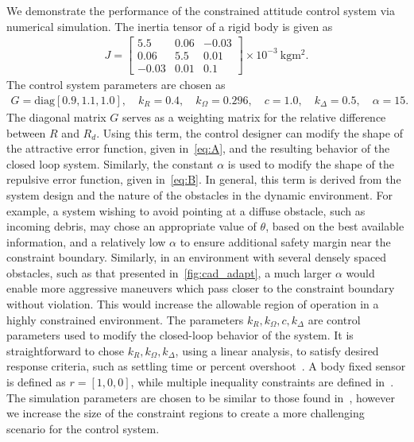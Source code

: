 We demonstrate the performance of the constrained attitude control system via numerical simulation.
The inertia tensor of a rigid body is given as
\begin{gather*}
    J = \begin{bmatrix}
	\num{5.5} & \num{0.06} & \num{-0.03} \\
	\num{0.06} & \num{5.5} & \num{0.01} \\
	\num{-0.03} & \num{0.01} & \num{0.1}
    \end{bmatrix} \times 10^{-3}~\si{\kilo\gram\meter\squared} .
\end{gather*} 
The control system parameters are chosen as
\begin{gather*}
	G = \text{diag} [0.9,1.1,1.0], \quad k_R = 0.4 , \quad	k_\Omega = 0.296 ,\quad
	c = 1.0 , \quad k_\Delta = 0.5 , \quad \alpha = 15 .
\end{gather*}
The diagonal matrix \( G \) serves as a weighting matrix for the relative difference between \( R \) and \( R_d \). 
Using this term, the control designer can modify the shape of the attractive error function, given in~\cref{eq:A}, and the resulting behavior of the closed loop system.
Similarly, the constant \( \alpha \) is used to modify the shape of the repulsive error function, given in~\cref{eq:B}.
In general, this term is derived from the system design and the nature of the obstacles in the dynamic environment.
For example, a system wishing to avoid pointing at a diffuse obstacle, such as incoming debris, may chose an appropriate value of \( \theta \), based on the best available information, and a relatively low \( \alpha \) to ensure additional safety margin near the constraint boundary. 
Similarly, in an environment with several densely spaced obstacles, such as that presented in~\cref{fig:cad_adapt}, a much larger \( \alpha \) would enable more aggressive maneuvers which pass closer to the constraint boundary without violation.
This would increase the allowable region of operation in a highly constrained environment.
The parameters \( k_R, k_\Omega, c, k_\Delta\) are control parameters used to modify the closed-loop behavior of the system.
It is straightforward to chose \( k_R, k_\Omega, k_\Delta\), using a linear analysis, to satisfy desired response criteria, such as settling time or percent overshoot~\cite{nise2004}.
A body fixed sensor is defined as \(r = [1,0,0]\), while multiple inequality constraints are defined in~.
The simulation parameters are chosen to be similar to those found in~\cite{lee2011b}, however we increase the size of the constraint regions to create a more challenging scenario for the control system.
